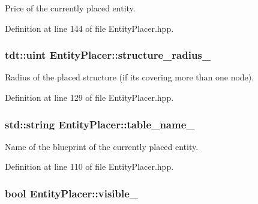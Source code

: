 Price of the currently placed entity. 



Definition at line 144 of file Entity\+Placer.\+hpp.

\subsubsection[{\texorpdfstring{structure\+\_\+radius\+\_\+}{structure_radius_}}]{\setlength{\rightskip}{0pt plus 5cm}tdt\+::uint Entity\+Placer\+::structure\+\_\+radius\+\_\+\hspace{0.3cm}{\ttfamily [private]}}\hypertarget{class_entity_placer_a329869555fb8492752f6deccf1678a98}{}\label{class_entity_placer_a329869555fb8492752f6deccf1678a98}


Radius of the placed structure (if it\textquotesingle{}s covering more than one node). 



Definition at line 129 of file Entity\+Placer.\+hpp.

\subsubsection[{\texorpdfstring{table\+\_\+name\+\_\+}{table_name_}}]{\setlength{\rightskip}{0pt plus 5cm}std\+::string Entity\+Placer\+::table\+\_\+name\+\_\+\hspace{0.3cm}{\ttfamily [private]}}\hypertarget{class_entity_placer_a51c07b2b7a1a2e66334fd961aea2bff4}{}\label{class_entity_placer_a51c07b2b7a1a2e66334fd961aea2bff4}


Name of the blueprint of the currently placed entity. 



Definition at line 110 of file Entity\+Placer.\+hpp.

\subsubsection[{\texorpdfstring{visible\+\_\+}{visible_}}]{\setlength{\rightskip}{0pt plus 5cm}bool Entity\+Placer\+::visible\+\_\+\hspace{0.3cm}{\ttfamily [private]}}\hypertarget{class_entity_placer_ad54b47813b660f962dcd04378ebf3ecd}{}\label{class_entity_placer_ad54b47813b660f962dcd04378ebf3ecd}


